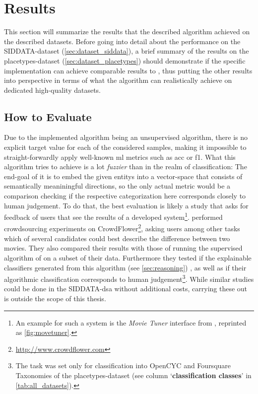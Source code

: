 \chapter{Results}

This section will summarize the results that the described algorithm achieved on the described datasets. Before going into detail about the performance on the SIDDATA-dataset (\ref{sec:dataset_siddata}), a brief summary of the results on the placetypes-dataset (\ref{sec:dataset_placetypes}) should demonstrate if the specific implementation can achieve comparable results to \mainalgos, thus putting the other results into perspective in terms of what the algorithm can realistically achieve on dedicated high-quality datasets.

\section{How to Evaluate}

Due to the implemented algorithm being an \gls{unsupervised} algorithm, there is no explicit target value for each of the considered samples, making it impossible to straight-forwardly apply well-known \gls{ml} metrics such as \Gls{acc} or \gls{f1}. What this algorithm tries to achieve is a lot \textit{fuzzier} than in the realm of classification: The end-goal of it is to embed the given \glspl{entity} into a vector-space that consists of semantically meaniningful directions, so the only actual metric would be a comparison checking if the respective categorization here corresponds closely to human judgement. To do that, the best evaluation is likely a study that asks for feedback of users that see the results of a developed system\footnote{An example for such a system is the \textit{Movie Tuner} interface from \textcite{VISR12}, reprinted as \autoref{fig:movetuner}.}. \textcite{Derrac2015} performed crowdsourcing experiments on CrowdFlower\footnote{\url{http://www.crowdflower.com}}, asking users among other tasks which of several candidates could best describe the difference between two movies. They also compared their results with those of running the supervised algorithm of \cite{VISR12} on a subset of their data. Furthermore they tested if the explainable classifiers generated from this algorithm (see \autoref{sec:reasoning})  \cite[48]{Derrac2015}, as well as if their algorithmic classification corresponds to human judgement\footnote{The task was set only for classification into OpenCYC and Foursquare Taxonomies of the placetypes-dataset (see column `\textbf{classification classes}' in \autoref{tab:all_datasets}).}. 
While similar studies could be done in the SIDDATA-\gls{dsa} \cite{Schurz2021} without additional costs, carrying these out is outside the scope of this thesis.


